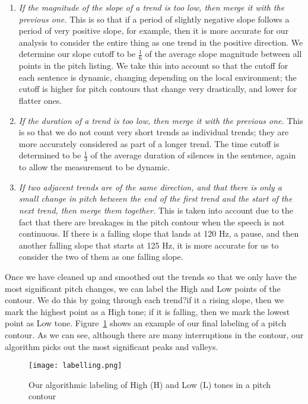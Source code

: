 \documentclass[pageno]{jpaper}
\begin{document}
\begin{enumerate}
  \item \textit{If the magnitude of the slope of a trend is too low, then merge it with the previous one.} This is so that if a period of slightly negative slope follows a period of very positive slope, for example, then it is more accurate for our analysis to consider the entire thing as one trend in the positive direction. We determine our slope cutoff to be $\frac{1}{6}$ of the average slope magnitude between all points in the pitch listing. We take this into account so that the cutoff for each sentence is dynamic, changing depending on the local environment; the cutoff is higher for pitch contours that change very drastically, and lower for flatter ones. 
  \item  \textit{If the duration of a trend is too low, then merge it with the previous one.} This is so that we do not count very short trends as individual trends; they are more accurately considered as part of a longer trend. The time cutoff is determined to be $\frac{1}{3}$ of the average duration of silences in the sentence, again to allow the measurement to be dynamic.
  \item \textit{If two adjacent trends are of the same direction, and that there is only a small change in pitch between the end of the first trend and the start of the next trend, then merge them together.} This is taken into account due to the fact that there are breakages in the pitch contour when the speech is not continuous. If there is a falling slope that lands at 120 Hz, a pause, and then another falling slope that starts at 125 Hz, it is more accurate for us to consider the two of them as one falling slope.
\end{enumerate}

Once we have cleaned up and smoothed out the trends so that we only have the most significant pitch changes, we can label the High and Low points of the contour. We do this by going through each trend?if it a rising slope, then we mark the highest point as a High tone; if it is falling, then we mark the lowest point as Low tone. Figure~\ref{fig:labelling} shows an example of our final labeling of a pitch contour. As we can see, although there are many interruptions in the contour, our algorithm picks out the most significant peaks and valleys.

\begin{figure}[hbt]
\centering
\texttt{[image: labelling.png]}
\caption{Our algorithmic labeling of High (H) and Low (L) tones in a pitch contour}
\label{fig:labelling}
\end{figure}
\end{document}
